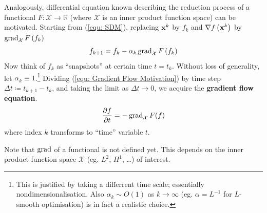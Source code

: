 \documentclass[../dissertation.tex]{subfiles}
\begin{document}
Analogously, differential equation known describing the reduction process of a functional $F:\mathcal{X} \rightarrow \mathbb{R}$ (where $\mathcal{X}$ is an inner product function space) can be motivated.
Starting from (\ref{equ: SDM}), replacing $\mathbf{x}^{k}$ by $f_k$ and $\nabla f\left( \mathbf{x}^k \right)$ by $\operatorname{grad}_{\mathcal{X}} F\left( f_k \right)$
\begin{equation}
    f_{k+1} = f_k - \alpha_k \operatorname{grad}_{\mathcal{X}} F \left( f_k \right)
    \label{equ: Gradient Flow Motivation}
\end{equation}
Now think of $f_k$ as ``snapshots'' at certain time $t = t_k$.
Without loss of generality, let $\alpha_k \equiv 1$.\footnote{
This is justified by taking a differrent time scale; essentially nondimensionalisation.
Also $\alpha_k \sim O (1)$ as $k \rightarrow \infty$ (eg. $\alpha = L^{-1}$ for $L$-smooth optimisation) is in fact a realistic choice.}
Dividing (\ref{equ: Gradient Flow Motivation}) by time step $\Delta t \coloneqq t_{k+1} - t_k$,
and taking the limit as $\Delta t \rightarrow 0$,
we acquire the \textbf{gradient flow equation}\cite{YSC2021}.
\begin{equation}
    \frac{\partial f}{\partial t} = - \operatorname{grad}_{\mathcal{X}} F (f)
    \label{equ: Gradient Flow Equation}
\end{equation}
where index $k$ transforms to ``time'' variable $t$.

Note that $\operatorname{grad}$ of a functional is not defined yet. This depends on the inner product function space $\mathcal{X}$ (eg. $L^2$, $H^1$, \ldots) of interest.
\end{document}
